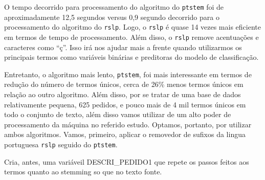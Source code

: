 \documentclass[]{article}
\begin{document}
O tempo decorrido para processamento do algoritmo do \texttt{ptstem} foi
de aproximadamente 12,5 segundos versus 0,9 segundo decorrido para o
processamento do algoritmo do \texttt{rslp}. Logo, o \texttt{rslp} é
quase 14 vezes mais eficiente em termos de tempo de processamento. Além
disso, o \texttt{rslp} remove acentuações e caracteres como ``ç''. Isso
irá nos ajudar mais a frente quando utilizarmos os principais termos
como variáveis binárias e preditoras do modelo de classificação.

Entretanto, o algoritmo mais lento, \texttt{ptstem}, foi mais
interessante em termos de redução do número de termos únicos, cerca de
26\% menos termos únicos em relação ao outro algoritmo. Além disso, por
se tratar de uma base de dados relativamente pequena, 625 pedidos, e
pouco mais de 4 mil termos únicos em todo o conjunto de texto, além
disso vamos utilizar de um alto poder de processamento da máquina no
referido estudo. Optamos, portanto, por utilizar ambos algoritmos.
Vamos, primeiro, aplicar o removedor de sufixos da lingua portuguesa
\texttt{rslp} seguido do \texttt{ptstem}.

Cria, antes, uma variáveil DESCRI\_PEDIDO1 que repete os passos feitos
aos termos quanto ao stemming so que no texto fonte.
\end{document}
